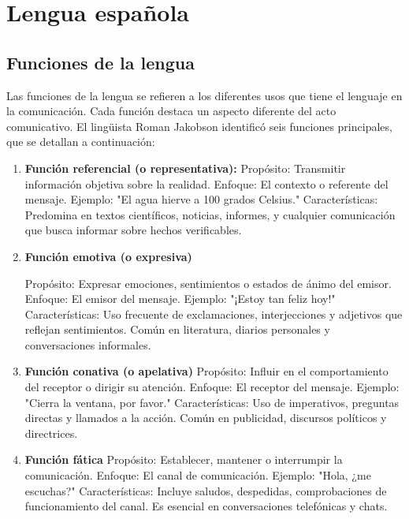 \section{Lengua española}
\subsection{Funciones de la lengua}

Las funciones de la lengua se refieren a los diferentes usos que tiene el lenguaje en la comunicación. Cada función destaca un aspecto diferente del acto comunicativo. El lingüista Roman Jakobson identificó seis funciones principales, que se detallan a continuación:

\begin{enumerate}
      \item \textbf{Función referencial (o representativa):}
            Propósito: Transmitir información objetiva sobre la realidad.
            Enfoque: El contexto o referente del mensaje.
            Ejemplo: "El agua hierve a 100 grados Celsius."
            Características: Predomina en textos científicos, noticias, informes, y cualquier comunicación que busca informar sobre hechos verificables.

      \item \textbf{Función emotiva (o expresiva)}

            Propósito: Expresar emociones, sentimientos o estados de ánimo del emisor.
            Enfoque: El emisor del mensaje.
            Ejemplo: "¡Estoy tan feliz hoy!"
            Características: Uso frecuente de exclamaciones, interjecciones y adjetivos que reflejan sentimientos. Común en literatura, diarios personales y conversaciones informales.

      \item \textbf{Función conativa (o apelativa)}
            Propósito: Influir en el comportamiento del receptor o dirigir su atención.
            Enfoque: El receptor del mensaje.
            Ejemplo: "Cierra la ventana, por favor."
            Características: Uso de imperativos, preguntas directas y llamados a la acción. Común en publicidad, discursos políticos y directrices.

      \item \textbf{Función fática}
            Propósito: Establecer, mantener o interrumpir la comunicación.
            Enfoque: El canal de comunicación.
            Ejemplo: "Hola, ¿me escuchas?"
            Características: Incluye saludos, despedidas, comprobaciones de funcionamiento del canal. Es esencial en conversaciones telefónicas y chats.


\end{enumerate}
